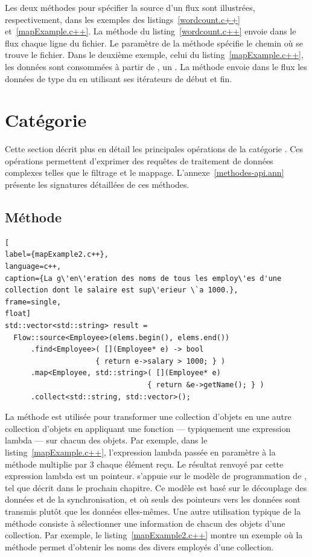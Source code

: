 Les deux m\'ethodes pour sp\'ecifier la source d'un flux sont illustr\'ees, respectivement, dans les exemples des listings~\ref{wordcount.c++} et~\ref{mapExample.c++}. La m\'ethode  du listing~\ref{wordcount.c++} envoie dans le flux chaque ligne du fichier. Le param\`etre  de la m\'ethode sp\'ecifie le chemin o\`u se trouve le fichier. Dans le deuxième exemple, celui du listing~\ref{mapExample.c++}, les donn\'ees sont consomm\'ees \`a partir de , un . La m\'ethode  envoie dans le flux les donn\'ees de type  du  en utilisant ses it\'erateurs de d\'ebut et fin.


\section{Cat\'egorie }

\label{transformation.sect}

Cette section d\'ecrit plus en d\'etail les principales op\'erations de la cat\'egorie . Ces op\'erations permettent d'exprimer des requ\^etes de traitement de donn\'ees complexes telles que le filtrage et le mappage. L'annexe~\ref{methodes-api.ann} présente les signatures détaillées de ces méthodes. 


\subsection{M\'ethode }



\begin{lstlisting}[
label={mapExample2.c++},
language=c++,
caption={La g\'en\'eration des noms de tous les employ\'es d'une collection dont le salaire est sup\'erieur \`a 1000.},
frame=single,
float]
std::vector<std::string> result =
  Flow::source<Employee>(elems.begin(), elems.end())
  	  .find<Employee>( [](Employee* e) -> bool 
					 { return e->salary > 1000; } )
      .map<Employee, std::string>( [](Employee* e) 
                                 { return &e->getName(); } )
      .collect<std::string, std::vector>();
\end{lstlisting}


La m\'ethode  est utilis\'ee pour transformer une collection d'objets en une autre collection d'objets en appliquant une fonction --- typiquement une expression lambda --- sur chacun des objets. Par exemple, dans le listing~\ref{mapExample.c++}, l'expression lambda pass\'ee en param\`etre \`a la m\'ethode  multiplie par 3 chaque \'el\'ement re\c{c}u. Le r\'esultat renvoy\'e par cette expression lambda est un pointeur. \PpFf{} s'appuie sur le mod\`ele de programmation de , tel que d\'ecrit dans le prochain chapitre. Ce mod\`ele est bas\'e sur le d\'ecouplage des donn\'ees et de la synchronisation, et o\`u seuls des pointeurs vers les donn\'ees sont transmis plut\^ot que les donn\'ees elles-m\^emes.
%
Une autre utilisation typique de la méthode  consiste \`a s\'electionner une information de chacun des objets d'une collection. Par exemple, le listing~\ref{mapExample2.c++} montre un exemple o\`u la méthode  permet d'obtenir les noms des divers employ\'es d'une collection. 



